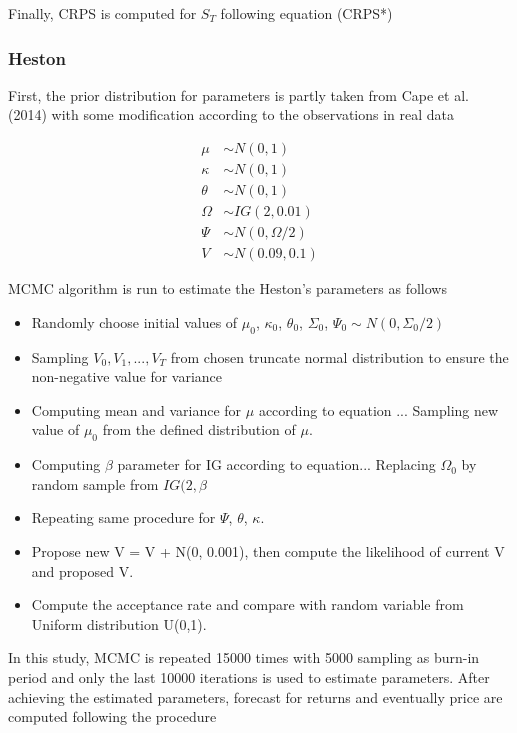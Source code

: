 \documentclass[12pt,a4paper]{article}
\numberwithin{equation}{section}
\begin{document}
Finally, CRPS is computed for $S_T$ following equation (CRPS*)

\subsubsection{Heston}

First, the prior distribution for parameters is partly taken from Cape et al. (2014) with some modification according to the observations in real data

\begin{align*}
\mu &\sim N(0,1) \\
\kappa &\sim N(0,1) \\
\theta &\sim N(0,1) \\
\Omega &\sim IG(2, 0.01) \\
\Psi &\sim N(0, \Omega/2) \\
V &\sim N(0.09, 0.1) 
\end{align*}

MCMC algorithm is run to estimate the Heston's parameters as follows

\begin{itemize}
\item Randomly choose initial values of $\mu_0$, $\kappa_0$, $\theta_0$, $\Sigma_0$, $\Psi_0 \sim N(0, \Sigma_0/2)$ \\
\item Sampling $V_0, V_1, ..., V_T$ from chosen truncate normal distribution to ensure the non-negative value for variance \\
\item Computing mean and variance for $\mu$ according to equation ... Sampling new value of $\mu_0$ from the defined distribution of $\mu$.\\
\item Computing $\beta$ parameter for IG according to equation... Replacing $\Omega_0$ by random sample from $IG(2, \beta$\\
\item Repeating same procedure for $\Psi$, $\theta$, $\kappa$. \\
\item Propose new V = V + N(0, 0.001), then compute the likelihood of current V and proposed V.\\
\item Compute the acceptance rate and compare with random variable from Uniform distribution U(0,1).
\end{itemize}

In this study, MCMC is repeated 15000 times with 5000 sampling as burn-in period and only the last 10000 iterations is used to estimate parameters. After achieving the estimated parameters, forecast for returns and eventually price are computed following the procedure
\end{document}
